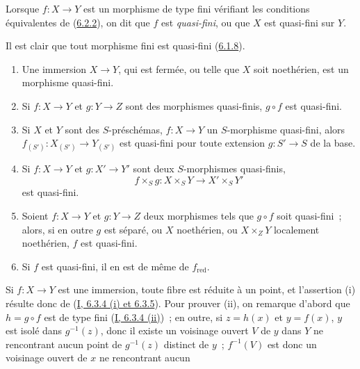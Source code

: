 \begin{definition}[6.2.3]
\label{II.6.2.3-fr}
Lorsque $f:X\to Y$ est un morphisme de type fini vérifiant les conditions
équivalentes de (\hyperref[II.6.2.2-fr]{6.2.2}), on dit que $f$ est
\emph{quasi-fini}, ou que $X$ est quasi-fini sur $Y$.
\end{definition}

Il est clair que tout morphisme fini est quasi-fini
(\hyperref[II.6.1.8-fr]{6.1.8}).

\begin{proposition}[6.2.4]
\label{II.6.2.4-fr}
\begin{enumerate}
\item[(i)] Une immersion $X\to Y$, qui est fermée, ou telle que $X$ soit
noethérien, est un morphisme quasi-fini.
\item[(ii)] Si $f:X\to Y$ et $g:Y\to Z$ sont des morphismes quasi-finis,
$g\circ f$ est quasi-fini.
\item[(iii)] Si $X$ et $Y$ sont des $S$-préschémas, $f:X\to Y$ un
$S$-morphisme quasi-fini, alors $f_{(S')}:X_{(S')}\to Y_{(S')}$ est quasi-fini
pour toute extension $g:S'\to S$ de la base.
\item[(iv)] Si $f:X\to Y$ et $g:X'\to Y'$ sont deux $S$-morphismes
quasi-finis,
\[
f\times_S g:X\times_S Y\to X'\times_S Y'
\]
est quasi-fini.
\item[(v)] Soient $f:X\to Y$ et $g:Y\to Z$ deux morphismes tels que $g\circ
f$ soit quasi-fini~; alors, si en outre $g$ est séparé, ou $X$ noethérien, ou
$X\times_ZY$ localement noethérien, $f$ est quasi-fini.
\item[(vi)] Si $f$ est quasi-fini, il en est de même de $f_{\mathrm{red}}$.
\end{enumerate}
\end{proposition}

Si $f:X\to Y$ est une immersion, toute fibre est réduite à un point, et
l'assertion (i) résulte donc de (\hyperref[I.6.3.4-fr]{I, 6.3.4 (i) et
6.3.5}). Pour prouver (ii), on remarque d'abord que $h=g\circ f$ est de type
fini (\hyperref[I.6.3.4-fr]{I, 6.3.4 (ii)})~; en outre, si $z=h(x)$ et
$y=f(x)$, $y$ est isolé dans $g^{-1}(z)$, donc il existe un voisinage ouvert
$V$ de $y$ dans $Y$ ne rencontrant aucun point de $g^{-1}(z)$ distinct de
$y$~; $f^{-1}(V)$ est donc un voisinage ouvert de $x$ ne rencontrant aucun

